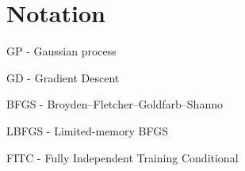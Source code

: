 \chapter*{Notation}
\label{c:Notation}

GP - Gaussian process

GD - Gradient Descent

BFGS - Broyden–Fletcher–Goldfarb–Shanno

LBFGS -  Limited-memory BFGS

FITC - Fully Independent Training Conditional


